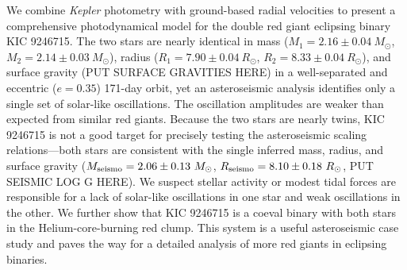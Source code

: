 We combine \emph{Kepler} photometry with ground-based radial velocities to present a comprehensive photodynamical model for the double red giant eclipsing binary KIC 9246715. The two stars are nearly identical in mass ($M_1 = 2.16 \pm 0.04\ M_{\odot}$, $M_2 = 2.14 \pm 0.03\ M_{\odot}$), radius ($R_1 = 7.90 \pm 0.04 \ R_{\odot}$, $R_2 = 8.33 \pm 0.04 \ R_{\odot}$), and surface gravity (PUT SURFACE GRAVITIES HERE) in a well-separated and eccentric ($e = 0.35$) 171-day orbit, yet an asteroseismic analysis identifies only a single set of solar-like oscillations. The oscillation amplitudes are weaker than expected from similar red giants. Because the two stars are nearly twins, KIC 9246715 is not a good target for precisely testing the asteroseismic scaling relations---both stars are consistent with the single inferred mass, radius, and surface gravity ($M_{\rm{seismo}} = 2.06 \pm 0.13 \ M_{\odot}$, $R_{\rm{seismo}} = 8.10 \pm 0.18 \ R_{\odot}$, PUT SEISMIC LOG G HERE). We suspect stellar activity or modest tidal forces are responsible for a lack of solar-like oscillations in one star and weak oscillations in the other. We further show that KIC 9246715 is a coeval binary with both stars in the Helium-core-burning red clump. This system is a useful asteroseismic case study and paves the way for a detailed analysis of more red giants in eclipsing binaries.
    
    